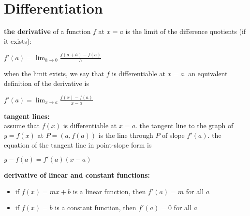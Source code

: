 \documentclass{article}
\begin{document}
\section*{Differentiation}

\textbf{the derivative} of a function $f$ at $x = a$ is the limit of the difference quotients (if it exists):
\begin{center} $f'(a) = \lim_{h \to 0}\frac{f(a + h) - f(a)}{h}$ \end{center}
when the limit exists, we say that $f$ is differentiable at $x = a$. an equivalent definition of the derivative is
\begin{center} $f'(a) = \lim_{x \to a}\frac{f(x) - f(a)}{x - a}$ \end{center}

\textbf{tangent lines:}\\
assume that $f(x)$ is differentiable at $x = a$. the tangent line to the graph of $y = f(x)$ at $P = (a, f(a))$ is the line through $P$ of slope $f'(a)$. the equation of the tangent line in point-slope form is
\begin{center} $y - f(a) = f'(a)(x - a)$ \end{center}

\textbf{derivative of linear and constant functions:}
	\begin{itemize}
		\item if $f(x) = mx + b$ is a linear function, then $f'(a) = m$ for all $a$
		\item if $f(x) = b$ is a constant function, then $f'(a) = 0$ for all $a$
	\end{itemize}
\end{document}
